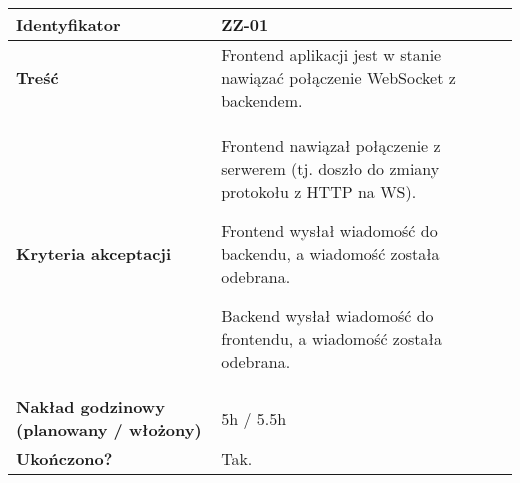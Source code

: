 \begin{tabular}{ | l | l | }
	\hline
		\textbf{Identyfikator} &
		ZZ-01
		\\

	\hline
		\textbf{Treść} & \parbox[t]{11.5cm}{\strut
			Frontend aplikacji jest w stanie nawiązać połączenie WebSocket z backendem.
		\strut}\\

	\hline
		\parbox[t]{4cm}{\textbf{Kryteria akceptacji}} & \parbox[t]{11.5cm}{\strut
			\begin{enumreq}
				\item Frontend nawiązał połączenie z serwerem (tj. doszło do
        zmiany protokołu z HTTP na WS).
        \item Frontend wysłał wiadomość do backendu, a wiadomość została
        odebrana.
        \item Backend wysłał wiadomość do frontendu, a wiadomość została
        odebrana.
			\end{enumreq}
			\strut}
		\\

    \hline
  		\parbox[t]{4cm}{\textbf{Nakład godzinowy (planowany / włożony)}} & \parbox[t]{11.5cm}{\strut
  			5h / 5.5h
  		\strut}\\

    \hline
      \parbox[t]{4cm}{\textbf{Ukończono?}} &
      \parbox[t]{11.5cm}{\strut
        Tak.
      \strut}\\

    \hline
  \end{tabular}

  \vspace{1em}

